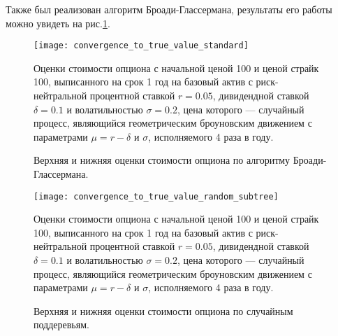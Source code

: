 Также был реализован алгоритм Броади-Глассермана, результаты его работы можно увидеть на рис.\ref{fig:true_value_test_standard}.
\begin{figure}%
    \centering
	\texttt{[image: convergence\_to\_true\_value\_standard]}
	\caption{Верхняя и нижняя оценки стоимости опциона по алгоритму Броади-Глассермана.}
	\label{fig:true_value_test_standard}
	\footnotesize{Оценки стоимости опциона с начальной ценой 100 и ценой страйк 100, выписанного на срок 1 год на базовый актив с риск-нейтральной процентной ставкой $r = 0.05$, дивидендной ставкой $\delta = 0.1$ и волатильностью $\sigma=0.2$, цена которого --- случайный процесс, являющийся геометрическим броуновским движением с параметрами $\mu = r - \delta$ и $\sigma$, исполняемого 4 раза в году.}
\end{figure}
\begin{figure}%
    \centering
    \texttt{[image: convergence\_to\_true\_value\_random\_subtree]}
    \caption{Верхняя и нижняя оценки стоимости опциона по случайным поддеревьям.}
    \label{fig:random_subtree_modified_ev}
    \footnotesize{Оценки стоимости опциона с начальной ценой 100 и ценой страйк 100, выписанного на срок 1 год на базовый актив с риск-нейтральной процентной ставкой $r = 0.05$, дивидендной ставкой $\delta = 0.1$ и волатильностью $\sigma=0.2$, цена которого --- случайный процесс, являющийся геометрическим броуновским движением с параметрами $\mu = r - \delta$ и $\sigma$, исполняемого 4 раза в году.}
\end{figure}

